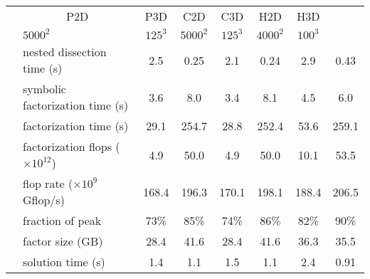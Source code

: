 \documentclass{article}
\begin{document}
\begin{table}[htp!]\footnotesize
  \renewcommand{\arraystretch}{1.25}
  \setlength{\tabcolsep}{0.35em}
  \newcommand{\ce}[1]{\multicolumn{1}{c|}{#1}}
  \newcommand{\cee}[1]{\multicolumn{1}{c|}{#1}}
  \begin{center}
    \begin{tabular}{|c|l||c|c|c|c|c|c|}
      \hhline{|-|-|-|-|-|-|-|-|}
      \multicolumn{2}{|r||}{problem}                                                                          
      &    \cee{P2D} &    \cee{P3D} &    \cee{C2D} &   \cee{C3D}  &    \cee{H2D} &   \cee{H3D} \\ 
      \hhline{|-|-|-|-|-|-|-|-|}
      \multicolumn{2}{|r||}{grid size}
      &        $5000^2$ &      $125^3$ &    $5000^2$ &     $125^3$ &  $4000^2$ &     $100^3$ \\ 
      \hhline{==::=:=:=:=:=:=}
      \multirow{10}{*}{\rotatebox{90}{Multifrontal}}                                                 
      &              nested dissection time (s) &  2.5    &  0.25  & 2.1   &  0.24   & 2.9  & 0.43  \\ 
      \hhline{|~-||-|-|-|-|-|-|}                                                         
      &         symbolic factorization time (s) &  3.6    &  8.0   &  3.4  &  8.1   & 4.5  &  6.0   \\ 
      \hhline{|~-||-|-|-|-|-|-|}                                                         
      &                  factorization time (s) &  29.1  &  254.7  &  28.8 &  252.4 & 53.6 &  259.1 \\ 
      \hhline{|~-||-|-|-|-|-|-|}                                                         
      &    factorization flops ($\times10^{12}$) &   4.9  &  50.0  &  4.9  &   50.0  & 10.1  &  53.5  \\ 
      &   \qquad flop rate ($\times10^9$Gflop/s) & 168.4 & 196.3   & 170.1 & 198.1  & 188.4  & 206.5 \\
      &   \qquad fraction of peak                & 73\%  & 85\%    & 74\%  & 86\%   & 82\%   & 90\% \\
      \hhline{|~-||-|-|-|-|-|-|}                                                         
      &                        factor size (GB) &  28.4   &  41.6  &  28.4  & 41.6  & 36.3   &  35.5 \\ 
      \hhline{|~-||-|-|-|-|-|-|}                                                         
      &                       solution time (s) &   1.4    & 1.1   &  1.5  &  1.1   & 2.4   &  0.91  \\ 

\end{tabular}
\end{center}
\end{table}
\end{document}
